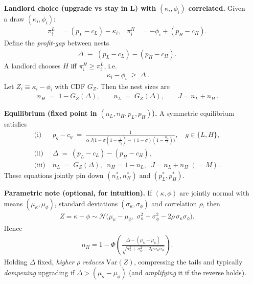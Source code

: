 \documentclass{article}
\begin{document}
\medskip
\textbf{Landlord choice (upgrade vs stay in L) with $(\kappa_i,\phi_i)$ correlated.}
Given a draw $(\kappa_i,\phi_i)$:
\begin{align*}
\pi_i^{L} &= (p_L - c_L) - \kappa_i, 
&
\pi_i^{H} &= -\phi_i + (p_H - c_H).
\end{align*}
Define the \emph{profit-gap} between nests
\begin{align*}
\Delta \;\equiv\; (p_L - c_L) - (p_H - c_H).
\end{align*}
A landlord chooses $H$ iff $\pi_i^{H}\ge \pi_i^{L}$, i.e.
\begin{align*}
\boxed{\;\kappa_i - \phi_i \;\ge\; \Delta\; }.
\end{align*}
Let $Z_i\equiv \kappa_i-\phi_i$ with CDF $G_Z$. Then the nest sizes are
\begin{align*}
\boxed{\,n_H \;=\; 1 - G_Z(\Delta), \qquad n_L \;=\; G_Z(\Delta),\qquad J=n_L+n_H\,}.
\end{align*}

\medskip
\textbf{Equilibrium (fixed point in $(n_L,n_H,p_L,p_H)$).}
A symmetric equilibrium satisfies
\begin{align*}
\text{(i)}\;& p_g - c_g \;=\; \frac{1}{\alpha\,J\Big(1 - \sigma(1-\tfrac{1}{n_g}) - (1-\sigma)(1-\tfrac{n_g}{J})\Big)},\quad g\in\{L,H\},\\[4pt]
\text{(ii)}\;& \Delta \;=\; (p_L - c_L) - (p_H - c_H),\\[4pt]
\text{(iii)}\;& n_L \;=\; G_Z(\Delta),\;\; n_H=1-n_L,\;\; J=n_L+n_H \; (=M).
\end{align*}
These equations jointly pin down $(n_L^\ast,n_H^\ast)$ and $(p_L^\ast,p_H^\ast)$.

\medskip
\textbf{Parametric note (optional, for intuition).}
If $(\kappa,\phi)$ are jointly normal with means $(\mu_\kappa,\mu_\phi)$, standard deviations $(\sigma_\kappa,\sigma_\phi)$ and correlation $\rho$, then
\begin{align*}
Z=\kappa-\phi \sim \mathcal N\!\Big(\mu_\kappa-\mu_\phi,\; \sigma_\kappa^2+\sigma_\phi^2 - 2\rho\,\sigma_\kappa\sigma_\phi\Big).
\end{align*}
Hence
\begin{align*}
n_H
=1-\Phi\!\left(\frac{\Delta-(\mu_\kappa-\mu_\phi)}{\sqrt{\sigma_\kappa^2+\sigma_\phi^2 - 2\rho\,\sigma_\kappa\sigma_\phi}}\right).
\end{align*}
Holding $\Delta$ fixed, \emph{higher} $\rho$ \emph{reduces} $\mathrm{Var}(Z)$, compressing the tails and typically \emph{dampening} upgrading if $\Delta>(\mu_\kappa-\mu_\phi)$ (and \emph{amplifying} it if the reverse holds).
\end{document}
